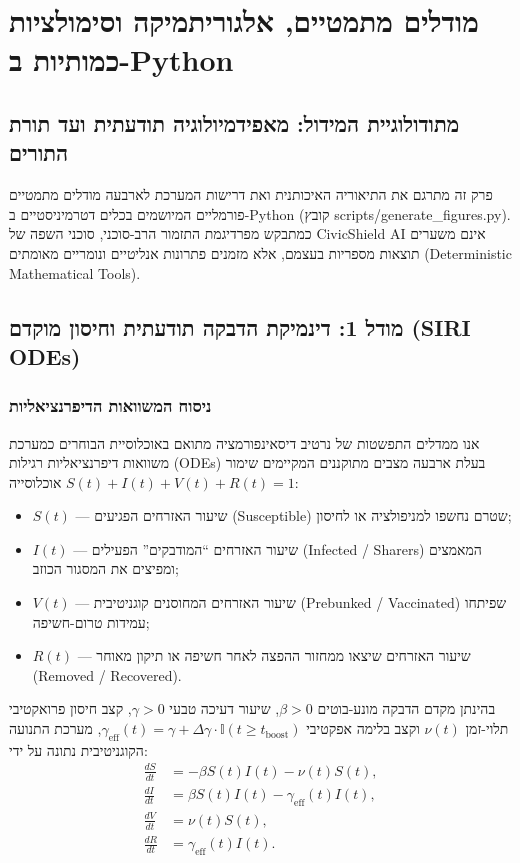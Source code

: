 \chapter{מודלים מתמטיים, אלגוריתמיקה וסימולציות כמותיות ב-Python}
\label{ch:models}

\section{מתודולוגיית המידול: מאפידמיולוגיה תודעתית ועד תורת התורים}
פרק זה מתרגם את התיאוריה האיכותנית ואת דרישות המערכת לארבעה מודלים מתמטיים פורמליים המיושמים בכלים דטרמיניסטיים ב-\textenglish{Python} (קובץ \textenglish{scripts/generate\_figures.py}). כמתבקש מפרדיגמת התזמור הרב-סוכני, סוכני השפה של \textenglish{CivicShield AI} אינם משערים תוצאות מספריות בעצמם, אלא מזמנים פתרונות אנליטיים ונומריים מאומתים (\textenglish{Deterministic Mathematical Tools}).

\section{מודל 1: דינמיקת הדבקה תודעתית וחיסון מוקדם (SIRI ODEs)}
\label{sec:siri}

\subsection{ניסוח המשוואות הדיפרנציאליות}
אנו ממדלים התפשטות של נרטיב דיסאינפורמציה מתואם באוכלוסיית הבוחרים כמערכת משוואות דיפרנציאליות רגילות (\textenglish{ODEs}) בעלת ארבעה מצבים מתוקננים המקיימים שימור אוכלוסייה $S(t) + I(t) + V(t) + R(t) = 1$:
\begin{itemize}
    \item $S(t)$ --- שיעור האזרחים הפגיעים (\textenglish{Susceptible}) שטרם נחשפו למניפולציה או לחיסון;
    \item $I(t)$ --- שיעור האזרחים ``המודבקים'' הפעילים (\textenglish{Infected / Sharers}) המאמצים ומפיצים את המסגור הכוזב;
    \item $V(t)$ --- שיעור האזרחים המחוסנים קוגניטיבית (\textenglish{Prebunked / Vaccinated}) שפיתחו עמידות טרום-חשיפה;
    \item $R(t)$ --- שיעור האזרחים שיצאו ממחזור ההפצה לאחר חשיפה או תיקון מאוחר (\textenglish{Removed / Recovered}).
\end{itemize}

בהינתן מקדם הדבקה מונע-בוטים $\beta > 0$, שיעור דעיכה טבעי $\gamma > 0$, קצב חיסון פרואקטיבי תלוי-זמן $\nu(t)$ וקצב בלימה אפקטיבי $\gamma_{\text{eff}}(t) = \gamma + \Delta\gamma \cdot \mathbb{I}(t \ge t_{\text{boost}})$, מערכת התנועה הקוגניטיבית נתונה על ידי:
\begin{align}
    \frac{dS}{dt} &= -\beta S(t) I(t) - \nu(t) S(t), \label{eq:siri_s} \\
    \frac{dI}{dt} &= \beta S(t) I(t) - \gamma_{\text{eff}}(t) I(t), \label{eq:siri_i} \\
    \frac{dV}{dt} &= \nu(t) S(t), \label{eq:siri_v} \\
    \frac{dR}{dt} &= \gamma_{\text{eff}}(t) I(t). \label{eq:siri_r}
\end{align}

